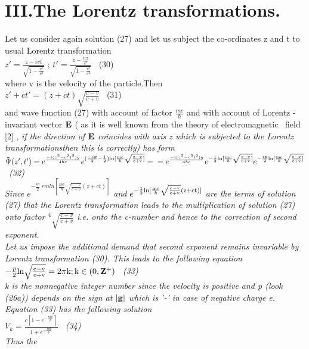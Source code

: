 \documentclass[a4paper,12pt] {article}
\begin{document}
{\section *{III.The Lorentz transformations.}
 Let us consider again solution (27) and let us subject the co-ordinates z and t to  usual Lorentz
transformation \\ $  z'=\frac {z-ivt}{\sqrt{1-\frac {v^2}{c^2}}}$ ;
 $ t' =\frac {z-\frac {ivz}{c^2}}{\sqrt{1-\frac {v^2}{c^2}}}$  \ (30)
\\where v is the velocity of the particle.Then
\\$ z'+ct' = (z+ct) \sqrt{\frac {c-v}{c+v}} $ \ (31) \\and wave function (27) with account of factor
 $\frac {mc}{\hbar}$ and with account of  Lorentz -invariant vector  $\bf E$
\rm ( as it is well known from the theory of electromagnetic \ field [2] , \it  if the direction of  $\bf E $
 \it coincides with axis \rm z \it which is subjected to the Lorentz transformations\rm then this is
correctly)  has form
\\$ \tilde \Psi (z',t') = e^{\frac {-i(z^2-c^2t^2)g}{4 \hbar c}} e^{(\frac {-ip}{2}-\frac {1}{2} )\rm  ln [\frac {mc}{\hbar} \sqrt{\frac  {c-v}{c+v}]} }=
\\ = e^{\frac {-i(z^2-c^2t^2)g}{4 \hbar c}} e^{-\frac {1}{2}\rm  ln [\frac {mc}{\hbar} \sqrt{\frac  {c-v}{c+v}]} }
 e^{-\frac {ip}{2}\rm ln [\frac {mc}{\hbar} \sqrt{\frac  {c-v}{c+v}]} } $\ (32)\\
Since $ e^{-\frac {ip}{2}\ rm ln [\frac {mc}{\hbar} \sqrt{\frac {c-v}{c+v}} (z+ct)]}$
and $e^{-\frac {1}{2}\rm  ln [\frac {mc}{\hbar} \sqrt{\frac  {c-v}{c+v}}(z+ct)]}$ are the terms of solution
(27) that the Lorentz transformation leads to the multiplication of solution (27) onto factor
 $ ^4 \sqrt{\frac{c-v}{c+v}} $ i.e. \it onto the c-number \rm  and hence to the correction of second
exponent.\\ Let us impose the additional demand that \it  second exponent remains invariable by Lorentz
 transformation \rm  (30). This leads to the following equation
\\$ -\frac {p}{2} \rm ln\sqrt{\frac {c-v}{c+v}} =2\pi k ;  k\in (0,\bf Z \rm ^+) $ \ (33)\\ k is the nonnegative
integer number since \it the velocity is positive \rm and p (look (26a)) depends on the sign at
 $\vert \bf g \vert$ \rm  which is '-' in  case of negative charge e.\\ Equation  (33) has the following
solution \\$ V_k = \frac {c[1-e^{-\frac {8 \pi k }{p}}]}{1+ e^{-\frac {8 \pi k }{p}}} $ \ (34) \\Thus \it the
}
\end{document}
